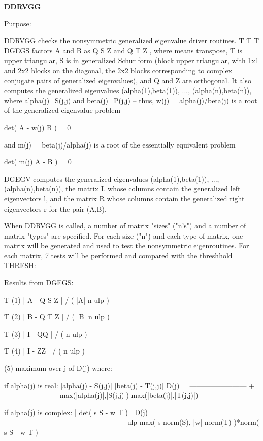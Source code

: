{\bfseries D\+D\+R\+V\+G\+G} 

\begin{DoxyParagraph}{Purpose\+: }
\begin{DoxyVerb} DDRVGG  checks the nonsymmetric generalized eigenvalue driver
 routines.
                               T          T        T
 DGEGS factors A and B as Q S Z  and Q T Z , where   means
 transpose, T is upper triangular, S is in generalized Schur form
 (block upper triangular, with 1x1 and 2x2 blocks on the diagonal,
 the 2x2 blocks corresponding to complex conjugate pairs of
 generalized eigenvalues), and Q and Z are orthogonal.  It also
 computes the generalized eigenvalues (alpha(1),beta(1)), ...,
 (alpha(n),beta(n)), where alpha(j)=S(j,j) and beta(j)=P(j,j) --
 thus, w(j) = alpha(j)/beta(j) is a root of the generalized
 eigenvalue problem

     det( A - w(j) B ) = 0

 and m(j) = beta(j)/alpha(j) is a root of the essentially equivalent
 problem

     det( m(j) A - B ) = 0

 DGEGV computes the generalized eigenvalues (alpha(1),beta(1)), ...,
 (alpha(n),beta(n)), the matrix L whose columns contain the
 generalized left eigenvectors l, and the matrix R whose columns
 contain the generalized right eigenvectors r for the pair (A,B).

 When DDRVGG is called, a number of matrix "sizes" ("n's") and a
 number of matrix "types" are specified.  For each size ("n")
 and each type of matrix, one matrix will be generated and used
 to test the nonsymmetric eigenroutines.  For each matrix, 7
 tests will be performed and compared with the threshhold THRESH:

 Results from DGEGS:

                  T
 (1)   | A - Q S Z  | / ( |A| n ulp )

                  T
 (2)   | B - Q T Z  | / ( |B| n ulp )

               T
 (3)   | I - QQ  | / ( n ulp )

               T
 (4)   | I - ZZ  | / ( n ulp )

 (5)   maximum over j of D(j)  where:

 if alpha(j) is real:
                     |alpha(j) - S(j,j)|        |beta(j) - T(j,j)|
           D(j) = ------------------------ + -----------------------
                  max(|alpha(j)|,|S(j,j)|)   max(|beta(j)|,|T(j,j)|)

 if alpha(j) is complex:
                                 | det( s S - w T ) |
           D(j) = ---------------------------------------------------
                  ulp max( s norm(S), |w| norm(T) )*norm( s S - w T )


\end{DoxyVerb}
\end{DoxyParagraph}
